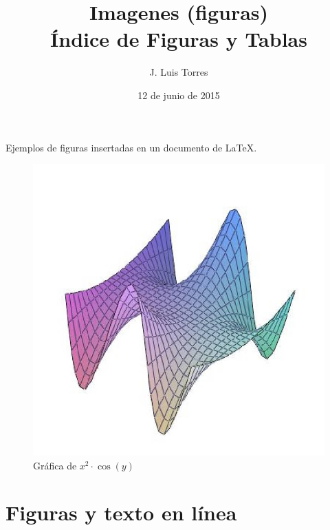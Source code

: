 \documentclass[letterpaper,12pt]{article}
\title{Imagenes (figuras) \\ 
	\vspace{1cm}Índice de Figuras y Tablas}
\author{J. Luis Torres}
\date{12 de junio de 2015}
\begin{document}
\maketitle

\tableofcontents

\listoffigures

\newpage

Ejemplos de figuras insertadas en un documento de \LaTeX{}.


\begin{figure}[h!]
\centering %
\includegraphics[scale=0.5]{grafica10.jpg}
\caption{Gráfica de $x^2 \cdot \cos (y)$}%
\end{figure}

\newpage

\section{Figuras y texto en línea}
\end{document}
